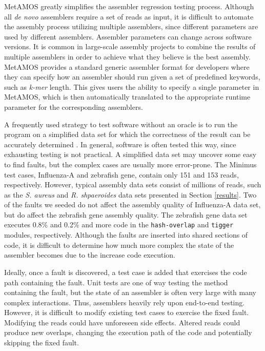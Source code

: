 MetAMOS greatly simplifies the assembler regression testing process.
Although all \emph{de novo} assemblers require a set of reads as input, it is difficult to automate the assembly process utilizing multiple assemblers, since different parameters are used by different assemblers.
Assembler parameters can change across software versions.
It is common in large-scale assembly projects to combine the results of multiple assemblers in order to achieve what they believe is the best assembly.
MetAMOS provides a standard generic assembler format for developers where they can specify how an assembler should run given a set of predefined keywords, such as \emph{k-mer} length.
This gives users the ability to specify a single parameter in MetAMOS, which is then automatically translated to the appropriate runtime parameter for the corresponding assemblers.


A frequently used strategy to test software without an oracle is to run the program on a simplified data set for which the correctness of the result can be accurately determined \cite{weyuker1982testing}.
In general, software is often tested this way, since exhausting testing is not practical.
A simplified data set may uncover some easy to find faults, but the complex cases are usually more error-prone.
The Minimus test cases, Influenza-A and zebrafish gene, contain only 151 and 153 reads, respectively.
However, typical assembly data sets consist of millions of reads, such as the \emph{S. aureus} and \emph{R. shpaeroides} data sets presented in Section \ref{results}.
Two of the faults we seeded do not affect the assembly quality of Influenza-A data set, but do affect the zebrafish gene assembly quality.
The zebrafish gene data set executes 0.8\% and 0.2\% and more code in the \texttt{hash-overlap} and \texttt{tigger} modules, respectively.
Although the faults are inserted into shared sections of code, it is difficult to determine how much more complex the state of the assembler becomes due to the increase code execution.

Ideally, once a fault is discovered, a test case is added that exercises the code path containing the fault.
Unit tests are one of way testing the method containing the fault, but the state of an assembler is often very large with many complex interactions.
Thus, assemblers heavily rely upon end-to-end testing.
However, it is difficult to modify existing test cases to exercise the fixed fault.
Modifying the reads %
could have unforeseen side effects.
Altered reads could produce new overlaps, changing the execution path of the code and potentially skipping the fixed fault.

